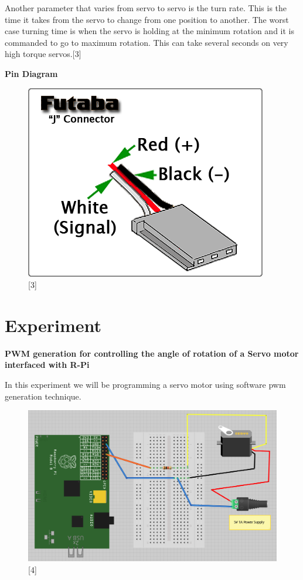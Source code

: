 \documentclass[11pt,a4paper]{article}
\begin{document}
	 Another parameter that varies from servo to servo is the turn rate. This is the time it takes from the servo to change from one position to another. The worst case turning time is when the servo is holding at the minimum rotation and it is commanded to go to maximum rotation. This can take several seconds on very high torque servos.[3]
	 
	 \newpage
	 \textbf{Pin Diagram}
	 \begin{figure}[h!]
	 	\includegraphics[scale=0.7]{fc.png}
	 	\centering
	 	\caption{[3]}
	 \end{figure}
	 
	\newpage
	\section{Experiment}
	
	\textbf{PWM generation for controlling the angle of rotation of a Servo motor interfaced with R-Pi}
	
	In this experiment we will be programming a servo motor using software pwm generation technique.
	
	\begin{figure}[h!]
		\includegraphics[scale=0.8]{i.png}
		\centering
		\caption{[4]}
	\end{figure}
	
\end{document}
